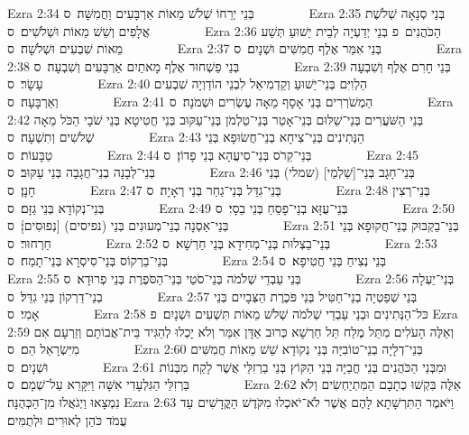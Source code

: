 Ezra 2:34	בְּנֵי יְרֵחוֹ שְׁלֹשׁ מֵאוֹת אַרְבָּעִים וַחֲמִשָּׁה׃ {ס}        
Ezra 2:35	בְּנֵי סְנָאָה שְׁלֹשֶׁת אֲלָפִים וְשֵׁשׁ מֵאוֹת וּשְׁלֹשִׁים׃ {ס}        
Ezra 2:36	הַכֹּהֲנִים {פ} בְּנֵי יְדַעְיָה לְבֵית יֵשׁוּעַ תְּשַׁע מֵאוֹת שִׁבְעִים וּשְׁלֹשָׁה׃ {ס}        
Ezra 2:37	בְּנֵי אִמֵּר אֶלֶף חֲמִשִּׁים וּשְׁנָיִם׃ {ס}        
Ezra 2:38	בְּנֵי פַשְׁחוּר אֶלֶף מָאתַיִם אַרְבָּעִים וְשִׁבְעָה׃ {ס}        
Ezra 2:39	בְּנֵי חָרִם אֶלֶף וְשִׁבְעָה עָשָׂר׃ {ס}        
Ezra 2:40	הַלְוִיִּם בְּנֵי־יֵשׁוּעַ וְקַדְמִיאֵל לִבְנֵי הוֹדַוְיָה שִׁבְעִים וְאַרְבָּעָה׃ {ס}        
Ezra 2:41	הַמְשֹׁרְרִים בְּנֵי אָסָף מֵאָה עֶשְׂרִים וּשְׁמֹנָה׃ {ס}        
Ezra 2:42	בְּנֵי הַשֹּׁעֲרִים בְּנֵי־שַׁלּוּם בְּנֵי־אָטֵר בְּנֵי־טַלְמֹן בְּנֵי־עַקּוּב בְּנֵי חֲטִיטָא בְּנֵי שֹׁבָי הַכֹּל מֵאָה שְׁלֹשִׁים וְתִשְׁעָה׃ {ס}        
Ezra 2:43	הַנְּתִינִים בְּנֵי־צִיחָא בְנֵי־חֲשׂוּפָא בְּנֵי טַבָּעוֹת׃ {ס}        
Ezra 2:44	בְּנֵי־קֵרֹס בְּנֵי־סִיעֲהָא בְּנֵי פָדוֹן׃ {ס}        
Ezra 2:45	בְּנֵי־לְבָנָה בְנֵי־חֲגָבָה בְּנֵי עַקּוּב׃ {ס}        
Ezra 2:46	בְּנֵי־חָגָב בְּנֵי־[שַׁלְמַי] (שמלי) בְּנֵי חָנָן׃ {ס}        
Ezra 2:47	בְּנֵי־גִדֵּל בְּנֵי־גַחַר בְּנֵי רְאָיָה׃ {ס}        
Ezra 2:48	בְּנֵי־רְצִין בְּנֵי־נְקוֹדָא בְּנֵי גַזָּם׃ {ס}        
Ezra 2:49	בְּנֵי־עֻזָּא בְנֵי־פָסֵחַ בְּנֵי בֵסָי׃ {ס}        
Ezra 2:50	בְּנֵי־אַסְנָה בְנֵי־מְעוּנִים בְּנֵי (נפיסים) [נְפוּסִים]׃ {ס}        
Ezra 2:51	בְּנֵי־בַקְבּוּק בְּנֵי־חֲקוּפָא בְּנֵי חַרְחוּר׃ {ס}        
Ezra 2:52	בְּנֵי־בַצְלוּת בְּנֵי־מְחִידָא בְּנֵי חַרְשָׁא׃ {ס}        
Ezra 2:53	בְּנֵי־בַרְקוֹס בְּנֵי־סִיסְרָא בְּנֵי־תָמַח׃ {ס}        
Ezra 2:54	בְּנֵי נְצִיחַ בְּנֵי חֲטִיפָא׃ {ס}        
Ezra 2:55	בְּנֵי עַבְדֵי שְׁלֹמֹה בְּנֵי־סֹטַי בְּנֵי־הַסֹּפֶרֶת בְּנֵי פְרוּדָא׃ {ס}        
Ezra 2:56	בְּנֵי־יַעְלָה בְנֵי־דַרְקוֹן בְּנֵי גִדֵּל׃ {ס}        
Ezra 2:57	בְּנֵי שְׁפַטְיָה בְנֵי־חַטִּיל בְּנֵי פֹּכֶרֶת הַצְּבָיִים בְּנֵי אָמִי׃ {ס}        
Ezra 2:58	כּל־הַנְּתִינִים וּבְנֵי עַבְדֵי שְׁלֹמֹה שְׁלֹשׁ מֵאוֹת תִּשְׁעִים וּשְׁנָיִם׃ {פ}
Ezra 2:59	וְאֵלֶּה הָעֹלִים מִתֵּל מֶלַח תֵּל חַרְשָׁא כְּרוּב אַדָּן אִמֵּר וְלֹא יָכְלוּ לְהַגִּיד בֵּית־אֲבוֹתָם וְזַרְעָם אִם מִיִּשְׂרָאֵל הֵם׃ {ס}        
Ezra 2:60	בְּנֵי־דְלָיָה בְנֵי־טוֹבִיָּה בְּנֵי נְקוֹדָא שֵׁשׁ מֵאוֹת חֲמִשִּׁים וּשְׁנָיִם׃ {ס}        
Ezra 2:61	וּמִבְּנֵי הַכֹּהֲנִים בְּנֵי חֳבַיָּה בְּנֵי הַקּוֹץ בְּנֵי בַרְזִלַּי אֲשֶׁר לָקַח מִבְּנוֹת בַּרְזִלַּי הַגִּלְעָדִי אִשָּׁה וַיִּקָּרֵא עַל־שְׁמָם׃ {ס}        
Ezra 2:62	אֵלֶּה בִּקְשׁוּ כְתָבָם הַמִּתְיַחְשִׂים וְלֹא נִמְצָאוּ וַיְגֹאֲלוּ מִן־הַכְּהֻנָּה׃
Ezra 2:63	וַיֹּאמֶר הַתִּרְשָׁתָא לָהֶם אֲשֶׁר לֹא־יֹאכְלוּ מִקֹּדֶשׁ הַקֳּדָשִׁים עַד עֲמֹד כֹּהֵן לְאוּרִים וּלְתֻמִּים׃
